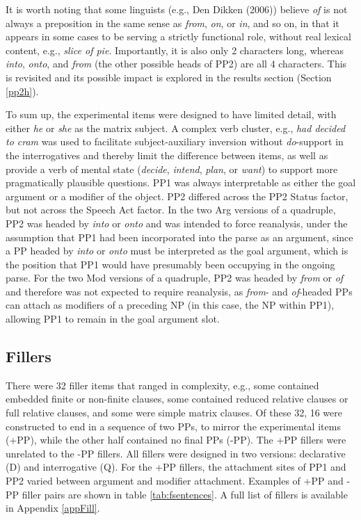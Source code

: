 \documentclass[11pt,oneside]{book}
\begin{document}
It is worth noting that some linguists (e.g., Den Dikken (2006)) believe \emph{of} is not always a preposition in the same sense as \emph{from}, \emph{on}, or \emph{in}, and so on, in that it appears in some cases to be serving a strictly functional role, without real lexical content, e.g., \emph{slice of pie}. Importantly, it is also only 2 characters long, whereas \emph{into}, \emph{onto}, and \emph{from} (the other possible heads of PP2) are all 4 characters. This is revisited and its possible impact is explored in the results section (Section \ref{pp2h}).

To sum up, the experimental items were designed to have limited detail, with either \emph{he} or \emph{she} as the matrix subject. A complex verb cluster, e.g., \emph{had decided to cram} was used to facilitate subject-auxiliary inversion without \emph{do}-support in the interrogatives and thereby limit the difference between items, as well as provide a verb of mental state (\emph{decide}, \emph{intend}, \emph{plan}, or \emph{want}) to support more pragmatically plausible questions. PP1 was always interpretable as either the goal argument or a modifier of the object. PP2 differed across the PP2 Status factor, but not across the Speech Act factor. In the two Arg versions of a quadruple, PP2 was headed by \emph{into} or \emph{onto} and was intended to force reanalysis, under the assumption that PP1 had been incorporated into the parse as an argument, since a PP headed by \emph{into} or \emph{onto} must be interpreted as the goal argument, which is the position that PP1 would have presumably been occupying in the ongoing parse. For the two Mod versions of a quadruple, PP2 was headed by \emph{from} or \emph{of} and therefore was not expected to require reanalysis, as \emph{from}- and \emph{of}-headed PPs can attach as modifiers of a preceding NP (in this case, the NP within PP1), allowing PP1 to remain in the goal argument slot.

\hypertarget{fillers}{%
\subsection{Fillers}\label{fillers}}

There were 32 filler items that ranged in complexity, e.g., some contained embedded finite or non-finite clauses, some contained reduced relative clauses or full relative clauses, and some were simple matrix clauses. Of these 32, 16 were constructed to end in a sequence of two PPs, to mirror the experimental items (+PP), while the other half contained no final PPs (-PP). The +PP fillers were unrelated to the -PP fillers. All fillers were designed in two versions: declarative (D) and interrogative (Q). For the +PP fillers, the attachment sites of PP1 and PP2 varied between argument and modifier attachment. Examples of +PP and -PP filler pairs are shown in table \ref{tab:fsentences}. A full list of fillers is available in Appendix \ref{appFill}.
\end{document}
